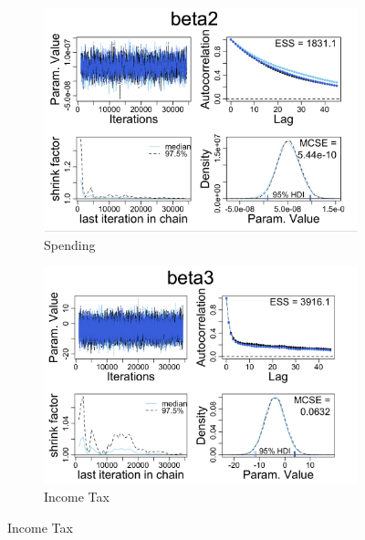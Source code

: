 \documentclass[12pt,english]{article}
\begin{document}
\begin{figure}[h]
 
\begin{subfigure}{0.5\textwidth}
\includegraphics[scale = 0.25]{beta2.png} 
\caption{Spending}
\label{fig:beta2}
\end{subfigure}
\begin{subfigure}{0.5\textwidth}
\includegraphics[scale = 0.25]{beta3.png}
\caption{Income Tax}
\label{fig:beta3}
\end{subfigure}
\label{fig:beta2}
\end{figure}
\end{document}
